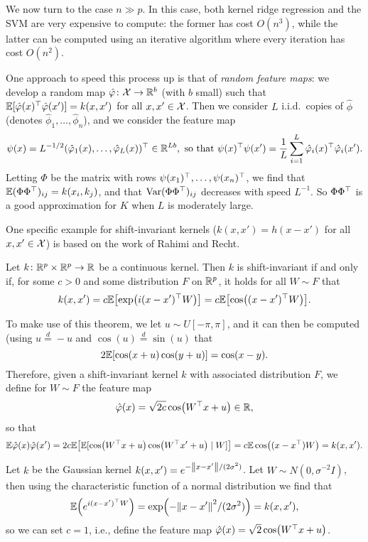 We now turn to the case $n \gg p$. In this case, both kernel ridge regression and the SVM are very expensive to compute: the former has cost $O(n^3)$, while the latter can be computed using an iterative algorithm where every iteration has cost $O(n^2)$. 

One approach to speed this process up is that of \emph{random feature maps}: we develop a random map $\hat{\varphi} \colon \mathcal X \to \mathbb R^b$ (with $b$ small) such that $\mathbb E[\hat{\varphi}(x)^\top\hat{\varphi}(x')] = k(x, x')$ for all $x, x' \in \mathcal X$. Then we consider $L$ i.i.d.\ copies of $\hat\phi$ (denotes $\hat\phi_1, \dotsc, \hat\phi_n$), and we consider the feature map
\[
\psi(x) = L^{-1/2} (\hat{\varphi}_1(x), \dotsc, \hat {\varphi}_L(x))^\top \in \mathbb R^{Lb}, \text{ so that } \psi(x)^\top\psi(x') = \frac1L \sum_{i=1}^L \hat{\varphi}_i(x)^\top \hat{\varphi}_i(x'). 
\]
Letting $\Phi$ be the matrix with rows $\psi(x_1)^\top, \dotsc, \psi(x_n)^\top$, we find that $\mathbb E(\Phi\Phi^\top)_{ij} = k(x_i, k_j)$, and that $\operatorname{Var}(\Phi\Phi^\top)_{ij}$ decreases with speed $L^{-1}$. So $\Phi\Phi^\top$ is a good approximation for $K$ when $L$ is moderately large.  

One specific example for shift-invariant kernels ($k(x, x') = h(x - x')$ for all $x, x' \in \mathcal X$) is based on the work of Rahimi and Recht. 
\begin{theorem}[Bochner]
	Let $k \colon \mathbb R^p \times \mathbb R^p \to \mathbb R$ be a continuous kernel. Then $k$ is shift-invariant if and only if, for some $c > 0$ and some distribution $F$ on $\mathbb R^p$, it holds for all $W \sim F$ that
	\[
	k(x, x') = c \mathbb E\qty[ \exp(i(x - x')^\top W)] = c\mathbb E\qty[ \cos((x - x')^\top W)]. 
	\]
\end{theorem}

To make use of this theorem, we let $u \sim U[-\pi, \pi]$, and it can then be computed (using $u \overset d= -u$ and $\cos(u) \overset d= \sin(u)$ that
\[
2\mathbb E\qty[\cos(x + u) \cos(y + u)] = \cos(x - y).  
\]
Therefore, given a shift-invariant kernel $k$ with associated distribution $F$, we define for $W \sim F$ the feature map
\[
\hat{\varphi}(x) = \sqrt{2c} \cos(W^\top x + u) \in \mathbb R, 
\]
so that
\[
\mathbb E\hat{\varphi}(x) \hat{\varphi}(x') = 2c \mathbb E\qty[ \mathbb E[ \cos(W^\top x + u)\cos(W^\top x' + u) \mid W]] = c \mathbb E \cos((x - x^\top)W) = k(x, x'). 
\]

\begin{example}
	Let $k$ be the Gaussian kernel $k(x, x') = e^{-\norm{x - x'}/(2\sigma^2)}$. Let $W \sim N(0, \sigma^{-2}I)$, then using the characteristic function of a normal distribution we find that
	\[
	\mathbb E\qty(e^{i(x - x')^\top W}) = \exp(- \norm{x - x'}^2/(2\sigma^2)) = k(x, x'), 
	\]
	so we can set $c = 1$, i.e., define the feature map $\hat{\varphi}(x) = \sqrt 2 \cos(W^\top x + u)$. 
\end{example}